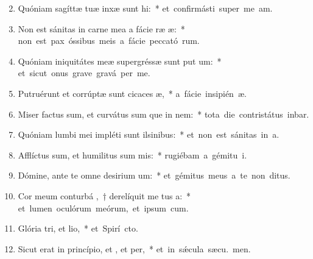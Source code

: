 \begin{flushleft}
\begin{enumerate}[leftmargin=*]
\setcounter{enumi}{1}

\item Quóniam sagíttæ tuæ inxæ sunt hi:~* \mbox{et confirmásti super me  am.}
\item Non est sánitas in carne mea a fácie ræ æ:~* \mbox{non est pax óssibus meis a fácie peccató rum.}
\item Quóniam iniquitátes meæ supergréssæ sunt put um:~* \mbox{et sicut onus grave gravá  per me.}
\item Putruérunt et corrúptæ sunt cicaces æ,~* \mbox{a fácie insipién æ.}
\item Miser factus sum, et curvátus sum que in nem:~* \mbox{tota die contristátus inbar.}
\item Quóniam lumbi mei impléti sunt ilsinibus:~* \mbox{et non est sánitas in  a.}
\item Afflíctus sum, et humilitus sum mis:~* \mbox{rugiébam a gémitu  i.}
\item Dómine, ante te omne desirium um:~* \mbox{et gémitus meus a te non  ditus.}
\item Cor meum conturbá ,~† derelíquit me tus a:~* \mbox{et lumen oculórum meórum, et ipsum   cum.}
\item Glória tri, et lio,~* \mbox{et Spirí cto.}
\item Sicut erat in princípio, et , et per,~* \mbox{et in s\'{\ae}cula sæcu. men.}

\end{enumerate}
\end{flushleft}

